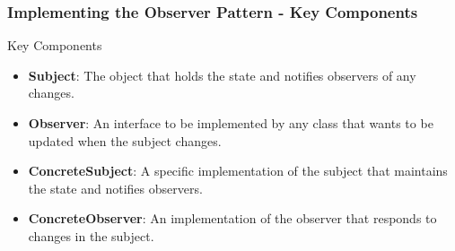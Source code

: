 \documentclass{beamer}
\begin{document}
\begin{frame}[fragile]
    \frametitle{Implementing the Observer Pattern - Key Components}
    \begin{block}{Key Components}
        \begin{itemize}
            \item \textbf{Subject}: The object that holds the state and notifies observers of any changes.
            \item \textbf{Observer}: An interface to be implemented by any class that wants to be updated when the subject changes.
            \item \textbf{ConcreteSubject}: A specific implementation of the subject that maintains the state and notifies observers.
            \item \textbf{ConcreteObserver}: An implementation of the observer that responds to changes in the subject.
        \end{itemize}
    \end{block}
\end{frame}
\end{document}
